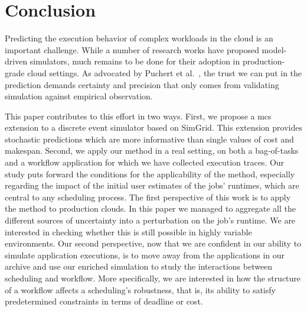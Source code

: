 \documentclass[10pt,conference,compsocconf]{IEEEtran}
\begin{document}
\section{Conclusion}

Predicting  the execution  behavior  of complex  workloads in  the  cloud is  an
important challenge. While a number of research works have proposed model-driven
simulators, much remains to be done for their adoption in production-grade cloud
settings. As  advocated by Puchert  et al.~\cite{PucherGWK15}, the trust  we can
put in  the prediction  demands certainty  and precision  that only  comes from
validating simulation against empirical observation.

This paper contributes to this effort in two ways. First, we propose a
\acl{mcs} extension to a discrete event simulator based on SimGrid. This
extension provides stochastic predictions which are more informative than single
values of cost and makespan. Second, we apply our method in a real setting,
on both a bag-of-tasks and a workflow application for which we have collected
execution traces. Our study puts forward the conditions for the applicability of
the method, especially regarding the impact of the initial user estimates of the
jobs' runtimes, which are central to any scheduling process. The first
perspective of this work is to apply the method to production clouds. In this
paper we managed to aggregate all the different sources of uncertainty into a
perturbation on the job's runtime. We are interested in checking whether this is
still possible in highly variable environments. Our second perspective, now that
we are confident in our ability to simulate application executions, is to move
away from the applications in our archive and use our enriched simulation to
study the interactions between scheduling and workflow. More specifically, we
are interested in how the structure of a workflow affects a scheduling's
robustness, that is, its ability to satisfy predetermined constraints in terms of
deadline or cost.





\newpage
\end{document}
